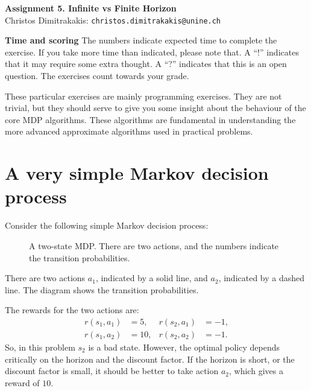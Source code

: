 \documentclass[twoside,a4paper]{article}
\begin{document}
\Large{\bf Assignment 5. Infinite vs Finite Horizon}
\vspace{1em}
\\
\large{Christos Dimitrakakis:} \texttt{christos.dimitrakakis@unine.ch}

\textbf{Time and scoring} The numbers indicate expected time to complete the exercise. If you take more time than indicated, please note that. A ``!'' indicates that it may require some extra thought. A ``?'' indicates that this is an open question. The exercises count towards your grade.

These particular exercises are mainly programming exercises. They are not trivial, but they should serve to give you some insight about the behaviour of the core MDP algorithms. These algorithms are fundamental in understanding the more advanced approximate algorithms used in practical problems.

\section{A very simple Markov decision process}
Consider the following simple Markov decision process:
\begin{figure}[h]
  \centering
  \caption{A two-state MDP. There are two actions, and the numbers indicate the transition probabilities.}
  \label{fig:two-state-mdp}
\end{figure}
There are two actions $a_1$, indicated by a solid line, and $a_2$, indicated by a dashed line. The diagram shows the transition probabilities. 

The rewards for the two actions are:
\begin{align}
  \label{eq:1}
  r(s_1, a_1) &= 5, & r(s_2, a_1) &= -1,
  \\
  r(s_1, a_2) &= 10, & r(s_2, a_2) &= -1.
\end{align}
So, in this problem $s_2$ is a bad state. However, the optimal policy depends critically on the horizon and the discount factor. If the horizon is short, or the discount factor is small, it should be better to take action $a_2$, which gives a reward of $10$.
\end{document}
